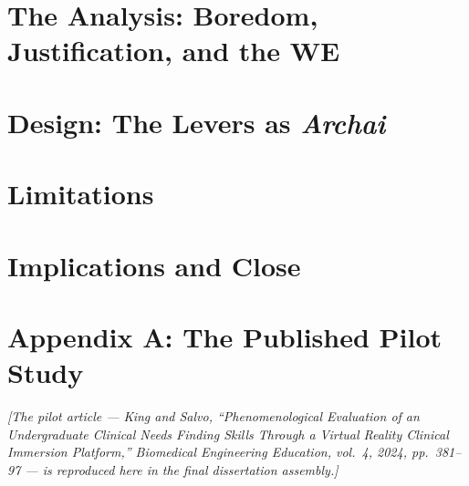 \documentclass{article}
\begin{document}
\section{The Analysis: Boredom, Justification, and the WE}


\section{Design: The Levers as \textit{Archai}}


\section{Limitations}


\section{Implications and Close}


\clearpage

\section*{Appendix A: The Published Pilot Study}\label{app:vr-pilot}
\textit{[The pilot article --- King and Salvo, ``Phenomenological Evaluation
of an Undergraduate Clinical Needs Finding Skills Through a Virtual Reality
Clinical Immersion Platform,'' Biomedical Engineering Education, vol.~4,
2024, pp.~381--97 --- is reproduced here in the final dissertation
assembly.]}

\clearpage


\clearpage


\clearpage

\end{document}
